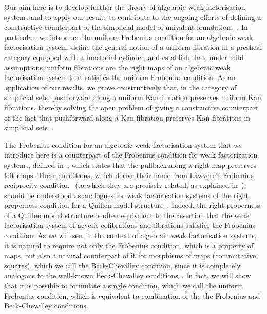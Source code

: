 \documentclass[reqno,10pt,a4paper,oneside,draft]{amsart}
\begin{document}
Our aim here is to develop further the theory of algebraic weak factorisation
systems and to apply our results to contribute to the ongoing efforts of defining a constructive counterpart
of the simplicial model of univalent foundations~\cite{voevodsky-simplicial-model}.
In particular, we introduce the uniform Frobenius condition for an algebraic weak
factorisation system, define the general notion of a uniform fibration in a presheaf category equipped with a functorial cylinder, and establish that, under mild assumptions, uniform fibrations are the right maps of an algebraic weak factorisation system that satisfies the uniform Frobenius condition. 
As an application of our results, we prove constructively that, in the category of simplicial sets,  pushforward along a uniform Kan fibration preserves uniform Kan fibrations, thereby solving the open problem of giving a constructive counterpart of the fact that pushforward along a Kan fibration preserves Kan fibrations in simplicial sets~\cite{coquand-non-constructivity-kan,voevodsky-simplicial-model}.

The Frobenius condition for an algebraic weak factorisation system that we introduce
here is a counterpart of the Frobenius condition for weak factorization systems,
defined in~\cite{garner:types-omega-groupoids}, which 
states that the pullback along a right map preserves left maps. 
These conditions, which derive their
name from Lawvere's Frobenius reciprocity condition~\cite{lawvere-equality} (to which
they are precisely related, as explained in~\cite{clementino:frobenius}), should be understood
as analogues for weak factorisation systems of the right properness condition 
for a Quillen model structure~\cite{hirschhorn-model-localizations}. Indeed, the right properness of a Quillen model
structure is often equivalent to the assertion that the weak factorisation system of
acyclic cofibrations and fibrations satisfies the Frobenius condition.
As we will see, in the context of algebraic weak factorisation systems, it is natural to require not only the Frobenius condition, which is a property of maps, but 
also a natural counterpart of it for morphisms of maps (\ie commutative squares), which we call the Beck-Chevalley condition,
since it is completely analogous to the well-known Beck-Chevalley conditions~\cite{lawvere-equality}.  In fact, we will show that it is possible to formulate a single condition, which we call the uniform Frobenius condition, which is equivalent to combination of the the Frobenius and Beck-Chevalley conditions.
\end{document}
